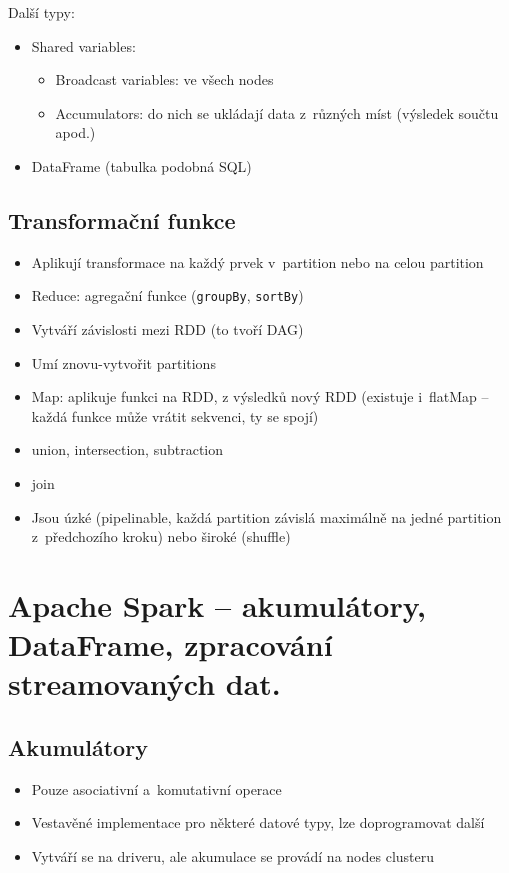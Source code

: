 Další typy:
\begin{itemize}
    \item Shared variables:
    \begin{itemize}
        \item Broadcast variables: ve všech nodes
        \item Accumulators: do nich se ukládají data z~různých míst (výsledek součtu apod.)
    \end{itemize}
    \item DataFrame (tabulka podobná SQL)
\end{itemize}

\subsection{Transformační funkce}
\begin{itemize}
    \item Aplikují transformace na každý prvek v~partition nebo na celou partition
    \item Reduce: agregační funkce (\texttt{groupBy}, \texttt{sortBy})
    \item Vytváří závislosti mezi RDD (to tvoří DAG)
    \item Umí znovu-vytvořit partitions
    \item Map: aplikuje funkci na RDD, z výsledků nový RDD (existuje i~flatMap -- každá funkce může vrátit sekvenci, ty se spojí)
    \item union, intersection, subtraction
    \item join
    \item Jsou úzké (pipelinable, každá partition závislá maximálně na jedné partition z~předchozího kroku) nebo široké (shuffle)
\end{itemize}

\section{Apache Spark – akumulátory, DataFrame, zpracování streamovaných dat.}
\subsection{Akumulátory}
\begin{itemize}
    \item Pouze asociativní a~komutativní operace
    \item Vestavěné implementace pro některé datové typy, lze doprogramovat další
    \item Vytváří se na driveru, ale akumulace se provádí na nodes clusteru
\end{itemize}
